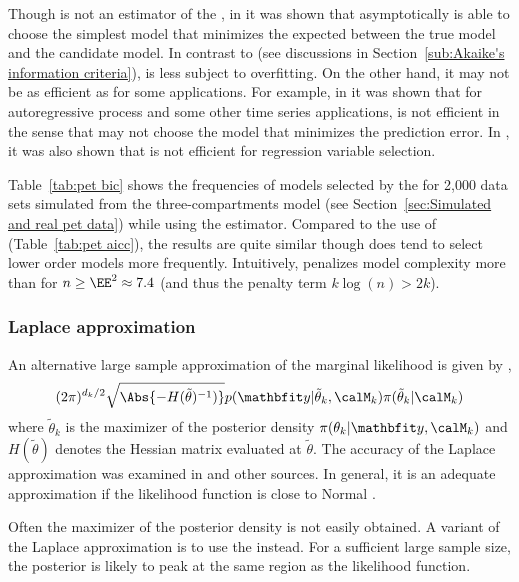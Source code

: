 Though \bic is not an estimator of the \kldfull, in \cite{Sin:1996vs} it was
shown that asymptotically \bic is able to choose the simplest model that
minimizes the expected \kld between the true model and the candidate model.
In contrast to \aic (see discussions in Section~\ref{sub:Akaike's information
criteria}), \bic is less subject to overfitting. On the other hand, it may
not be as efficient as \aic for some applications. For example, in
\cite{Lee:2001tm} it was shown that for autoregressive process and some other
time series applications, \bic is not efficient in the sense that \bic may
not choose the model that minimizes the prediction error. In
\cite[][sec.~4.7]{Claeskens:2008tq}, it was also shown that \bic is not
efficient for regression variable selection.

Table~\ref{tab:pet bic} shows the frequencies of models selected by the \bic
for 2,000 \pet data sets simulated from the three-compartments model (see
Section~\ref{sec:Simulated and real pet data}) while using the \nls
estimator. Compared to the use of \aicc (Table~\ref{tab:pet aicc}), the
results are quite similar though \bic does tend to select lower order models
more frequently. Intuitively, \bic penalizes model complexity more than \aic
for $n\ge\EE^2\approx7.4$ (and thus the penalty term $k\log(n) > 2k$).



\subsubsection{Laplace approximation}
\label{ssub:Laplace approximation}

An alternative large sample approximation of the marginal likelihood is given
by \cite{Tierney:1986vx},
\begin{equation}
  (2\pi)^{d_k/2}\sqrt{\Abs{-H(\tilde\theta)^{-1})}}
  p(\data|\tilde\theta_k,\calM_k)\pi(\tilde\theta_k|\calM_k)
\end{equation}
where $\tilde\theta_k$ is the maximizer of the posterior density
$\pi(\theta_k|\data,\calM_k)$ and $H(\tilde\theta)$ denotes the Hessian
matrix evaluated at $\tilde\theta$. The accuracy of the Laplace approximation
was examined in \cite{Kass:1992tz} and other sources. In general, it is an
adequate approximation if the likelihood function is close to Normal
\cite{Kass:1995vb}.

Often the maximizer of the posterior density is not easily obtained. A
variant of the Laplace approximation is to use the \mle instead. For a
sufficient large sample size, the posterior is likely to peak at the same
region as the likelihood function.

